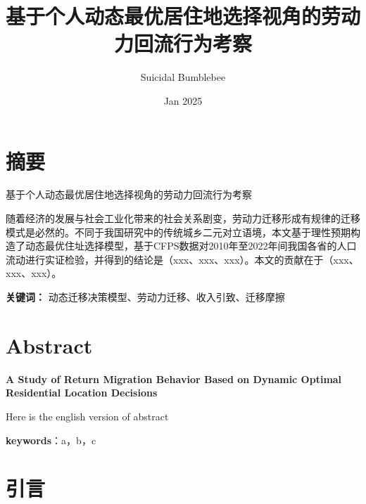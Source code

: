 \documentclass[a4paper,12pt,oneside]{book} %
\title{基于个人动态最优居住地选择视角的劳动力回流行为考察}
\author{Suicidal Bumblebee}
\date{Jan 2025}
\begin{document}
\maketitle

\frontmatter
\renewcommand{\thepage}{\Roman{page}} %
\chapter{摘要}

\begin{center}
    基于个人动态最优居住地选择视角的劳动力回流行为考察
\end{center}

随着经济的发展与社会工业化带来的社会关系剧变，劳动力迁移形成有规律的迁移模式是必然的。不同于我国研究中的传统城乡二元对立语境，本文基于理性预期构造了动态最优住址选择模型，基于CFPS数据对2010年至2022年间我国各省的人口流动进行实证检验，并得到的结论是（xxx、xxx、xxx）。本文的贡献在于（xxx、xxx、xxx）。

\textbf{关键词：} 动态迁移决策模型、劳动力迁移、收入引致、迁移摩擦


\chapter{Abstract}

\begin{center}
    \textbf{
    A Study of Return Migration Behavior Based on Dynamic Optimal Residential Location Decisions
    }
\end{center}

Here is the english version of abstract

\textbf{keywords}：a，b，c

\thispagestyle{empty}
\tableofcontents

\mainmatter
\newpage
\chapter{引言}
\end{document}
